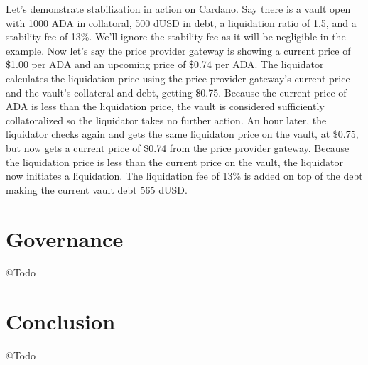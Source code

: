 \documentclass[12pt]{article}
\begin{document}
Let's demonstrate stabilization in action on Cardano. Say there is a vault open with 1000 ADA in collatoral, 500 dUSD in debt, a liquidation ratio of 1.5, and a stability fee of 13\%. We'll ignore the stability fee as it will be negligible in the example. Now let's say the price provider gateway is showing a current price of \$1.00 per ADA and an upcoming price of \$0.74 per ADA. The liquidator calculates the liquidation price using the price provider gateway's current price and the vault's collateral and debt, getting \$0.75. Because the current price of ADA is less than the liquidation price, the vault is considered sufficiently collatoralized so the liquidator takes no further action. An hour later, the liquidator checks again and gets the same liquidaton price on the vault, at \$0.75, but now gets a current price of \$0.74 from the price provider gateway. Because the liquidation price is less than the current price on the vault, the liquidator now initiates a liquidation. The liquidation fee of 13\% is added on top of the debt making the current vault debt 565 dUSD.

\section{Governance}
\begin{flushleft}
	\color{red} @Todo
\end{flushleft}

\section{Conclusion}
\begin{flushleft}
	\color{red} @Todo
\end{flushleft}
\end{document}
